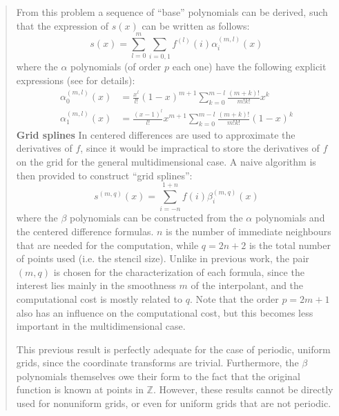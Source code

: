 \documentclass[11pt]{article}
\begin{document}
\begin{quotation}
        From this problem a sequence of ``base'' polynomials can be derived, such that the expression of $s(x)$
        can be written as follows:
        \begin{equation}
            s(x) = \sum_{l = 0}^m \sum_{i = 0, 1} f^{(l)}(i) \alpha_i^{(m, l)} (x)
        \end{equation}
        where the $\alpha$ polynomials (of order $p$ each one) have the following explicit expressions
        (see \cite{arXiv_splines} for details):
        \begin{align}
            \alpha^{(m, l)}_0 (x) &=
            \frac{x^l}{l!}(1-x)^{m+1} \sum_{k=0}^{m-l} \frac{(m+k)!}{m! k!}x^k \\
            \alpha^{(m, l)}_1 (x) &=
            \frac{(x-1)^l}{l!}x^{m+1} \sum_{k=0}^{m-l} \frac{(m+k)!}{m! k!}(1-x)^k
        \end{align}
      \textbf{Grid splines}
        In \cite{arXiv_splines} centered differences are used to approximate the derivatives of $f$,
        since it would be impractical to store the derivatives of $f$ on the grid for the general
        multidimensional case.
        A naive algorithm is then provided to construct ``grid splines'':
        \begin{equation}
            s^{(m, q)}(x) = \sum_{i = -n}^{1+n} f(i) \beta_i^{(m, q)}(x)
            \label{eq:uniform grid splines}
        \end{equation}
        where the $\beta$ polynomials can be constructed from the $\alpha$ polynomials and the centered
        difference formulas.
        $n$ is the number of immediate neighbours that are needed for the computation, while $q = 2n + 2$ is
        the total number of points used (i.e. the stencil size).
        Unlike in previous work, the pair $(m, q)$ is chosen for the characterization of each formula,
        since the interest lies mainly in the smoothness $m$ of the interpolant,
        and the computational cost is mostly related to $q$.
        Note that the order $p = 2m+1$ also has an influence on the computational cost,
        but this becomes less important in the multidimensional case.

        This previous result is perfectly adequate for the case of periodic, uniform grids, since the coordinate
        transforms are trivial.
        Furthermore, the $\beta$ polynomials themselves owe their form to the fact that the original function is
        known at points in $\mathbb{Z}$.
        However, these results cannot be directly used for nonuniform grids, or even for uniform grids that are
        not periodic.


\end{quotation}
\end{document}

